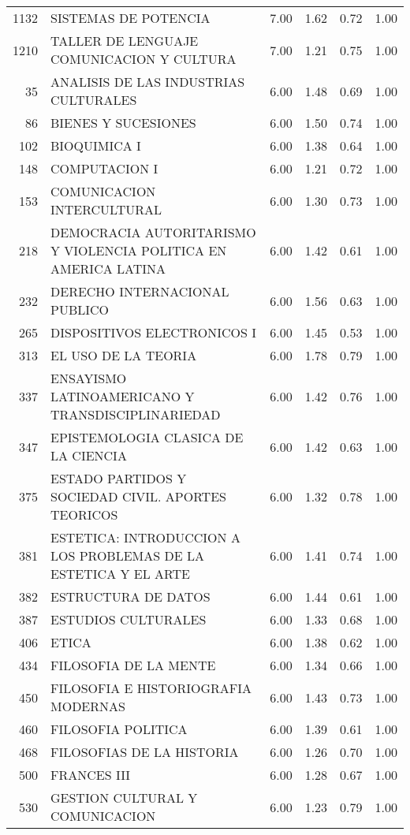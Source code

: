 \documentclass[12pt]{article}
\begin{document}
\begin{table}[ht]
\begin{tabular}{rlrrrr}
  1132 & SISTEMAS DE POTENCIA & 7.00 & 1.62 & 0.72 & 1.00 \\ 
  1210 & TALLER DE LENGUAJE COMUNICACION Y CULTURA & 7.00 & 1.21 & 0.75 & 1.00 \\ 
  35 & ANALISIS DE LAS INDUSTRIAS CULTURALES & 6.00 & 1.48 & 0.69 & 1.00 \\ 
  86 & BIENES Y SUCESIONES & 6.00 & 1.50 & 0.74 & 1.00 \\ 
  102 & BIOQUIMICA I & 6.00 & 1.38 & 0.64 & 1.00 \\ 
  148 & COMPUTACION I & 6.00 & 1.21 & 0.72 & 1.00 \\ 
  153 & COMUNICACION INTERCULTURAL & 6.00 & 1.30 & 0.73 & 1.00 \\ 
  218 & DEMOCRACIA AUTORITARISMO Y VIOLENCIA POLITICA EN AMERICA LATINA & 6.00 & 1.42 & 0.61 & 1.00 \\ 
  232 & DERECHO INTERNACIONAL PUBLICO & 6.00 & 1.56 & 0.63 & 1.00 \\ 
  265 & DISPOSITIVOS ELECTRONICOS I & 6.00 & 1.45 & 0.53 & 1.00 \\ 
  313 & EL USO DE LA TEORIA & 6.00 & 1.78 & 0.79 & 1.00 \\ 
  337 & ENSAYISMO LATINOAMERICANO Y TRANSDISCIPLINARIEDAD & 6.00 & 1.42 & 0.76 & 1.00 \\ 
  347 & EPISTEMOLOGIA CLASICA DE LA CIENCIA & 6.00 & 1.42 & 0.63 & 1.00 \\ 
  375 & ESTADO PARTIDOS Y SOCIEDAD CIVIL. APORTES TEORICOS & 6.00 & 1.32 & 0.78 & 1.00 \\ 
  381 & ESTETICA: INTRODUCCION A LOS PROBLEMAS DE LA ESTETICA Y EL ARTE & 6.00 & 1.41 & 0.74 & 1.00 \\ 
  382 & ESTRUCTURA DE DATOS & 6.00 & 1.44 & 0.61 & 1.00 \\ 
  387 & ESTUDIOS CULTURALES & 6.00 & 1.33 & 0.68 & 1.00 \\ 
  406 & ETICA & 6.00 & 1.38 & 0.62 & 1.00 \\ 
  434 & FILOSOFIA DE LA MENTE & 6.00 & 1.34 & 0.66 & 1.00 \\ 
  450 & FILOSOFIA E HISTORIOGRAFIA MODERNAS & 6.00 & 1.43 & 0.73 & 1.00 \\ 
  460 & FILOSOFIA POLITICA & 6.00 & 1.39 & 0.61 & 1.00 \\ 
  468 & FILOSOFIAS DE LA HISTORIA & 6.00 & 1.26 & 0.70 & 1.00 \\ 
  500 & FRANCES III & 6.00 & 1.28 & 0.67 & 1.00 \\ 
  530 & GESTION CULTURAL Y COMUNICACION & 6.00 & 1.23 & 0.79 & 1.00 \\ 

\end{tabular}
\end{table}
\end{document}
